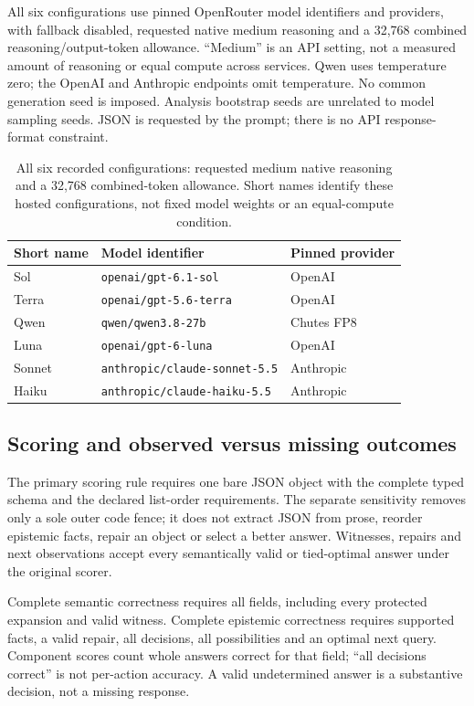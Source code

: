 \documentclass[a4paper,preprint,12pt,numbers,nopreprintline]{elsarticle}
\begin{document}
All six configurations use pinned OpenRouter model identifiers and providers, with fallback disabled, requested native medium reasoning and a 32,768 combined reasoning/output-token allowance. ``Medium'' is an API setting, not a measured amount of reasoning or equal compute across services. Qwen uses temperature zero; the OpenAI and Anthropic endpoints omit temperature. No common generation seed is imposed. Analysis bootstrap seeds are unrelated to model sampling seeds. JSON is requested by the prompt; there is no API response-format constraint.
\begin{table}[htbp]\centering\small
\caption{All six recorded configurations: requested medium native reasoning and a 32,768 combined-token allowance. Short names identify these hosted configurations, not fixed model weights or an equal-compute condition.}\label{tab:configurations}
\setlength{\tabcolsep}{3pt}
\begin{tabular}{lll}\toprule
Short name & Model identifier & Pinned provider\\\midrule
Sol & \texttt{openai/gpt-6.1-sol} & OpenAI\\
Terra & \texttt{openai/gpt-5.6-terra} & OpenAI\\
Qwen & \texttt{qwen/qwen3.8-27b} & Chutes FP8\\
Luna & \texttt{openai/gpt-6-luna} & OpenAI\\
Sonnet & \texttt{anthropic/claude-sonnet-5.5} & Anthropic\\
Haiku & \texttt{anthropic/claude-haiku-5.5} & Anthropic\\
\bottomrule\end{tabular}
\end{table}

\subsection{Scoring and observed versus missing outcomes}
The primary scoring rule requires one bare JSON object with the complete typed schema and the declared list-order requirements. The separate sensitivity removes only a sole outer code fence; it does not extract JSON from prose, reorder epistemic facts, repair an object or select a better answer. Witnesses, repairs and next observations accept every semantically valid or tied-optimal answer under the original scorer.

Complete semantic correctness requires all fields, including every protected expansion and valid witness. Complete epistemic correctness requires supported facts, a valid repair, all decisions, all possibilities and an optimal next query. Component scores count whole answers correct for that field; ``all decisions correct'' is not per-action accuracy. A valid undetermined answer is a substantive decision, not a missing response.
\end{document}
